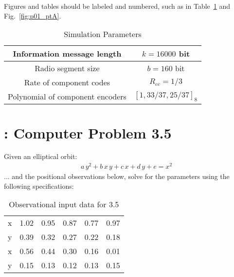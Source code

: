 \documentclass[paper=a4, fontsize=11pt]{scrartcl}
\numberwithin{equation}{section}		%
\numberwithin{figure}{section}			%
\numberwithin{table}{section}				%
\begin{document}
Figures and tables should be labeled and numbered, such as in Table~\ref{tab:simParameters} and Fig.~\ref{fig:p01_ptA}.
	
\begin{table}[!hbt]
	\begin{center}
		\caption{Simulation Parameters}
		\label{tab:simParameters}
		\begin{tabular}{|c|c|}
			\hline
			Information message length & $k=16000$ bit \\
			\hline
			Radio segment size & $b=160$ bit \\
			\hline
			Rate of component codes & $R_{cc}=1/3$\\
			\hline
			Polynomial of component encoders & $[1 , 33/37 , 25/37]_8$\\
			\hline
		\end{tabular}
	\end{center}
\end{table}
	
	
\pagebreak

\maketitle
\section{: Computer Problem 3.5}
Given an elliptical orbit:
\begin{align}
	a \, y^2 + b \, x\, y + c\, x + d\, y + e = x^2
\end{align}
... and the positional observations below, solve for the parameters using the following specifications:
\begin{table}[!hbt]
	\begin{center}
		\caption{Observational input data for 3.5}
		\label{tab:35input}
		\begin{tabular}{ c|c c c c c }
			x & 1.02 & 0.95 & 0.87 & 0.77 & 0.97 \\
			y & 0.39 & 0.32 & 0.27 & 0.22 & 0.18 \\
			\hline
			x & 0.56 & 0.44 & 0.30 & 0.16 & 0.01 \\
			y & 0.15 & 0.13 & 0.12 & 0.13 & 0.15 \\
		\end{tabular}
	\end{center}
\end{table}
\end{document}
